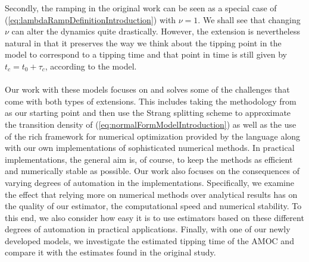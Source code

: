 Secondly, the ramping in the original work \cite[equation (2)]{Ditlevsen2023} can be seen as a special case of (\ref{eq:lambdaRampDefinitionIntroduction}) with $\nu = 1$. We shall see that changing $\nu$ can alter the dynamics quite drastically. However, the extension is nevertheless natural in that it preserves the way we think about the tipping point in the model to correspond to a tipping time and that point in time is still given by $t_c = t_0 + \tau_c$, according to the model.\\\\
Our work with these models focuses on and solves some of the challenges that come with both types of extensions. This includes taking the methodology from \cite{Ditlevsen2023} as our starting point and then use the Strang splitting scheme\cite{SplittingSchemes} to approximate the transition density of (\ref{eq:normalFormModelIntroduction}) as well as the use of the rich framework for numerical optimization provided by the  language along with our own implementations of sophisticated numerical methods. \cite{Rlang} In practical implementations, the general aim is, of course, to keep the methods as efficient and numerically stable as possible. Our work also focuses on the consequences of varying degrees of automation in the implementations. Specifically, we examine the effect that relying more on numerical methods over analytical results has on the quality of our estimator, the computational speed and numerical stability. To this end, we also consider how easy it is to use estimators based on these different degrees of automation in practical applications. Finally, with one of our newly developed models, we investigate the estimated tipping time of the AMOC and compare it with the estimates found in the original study.
